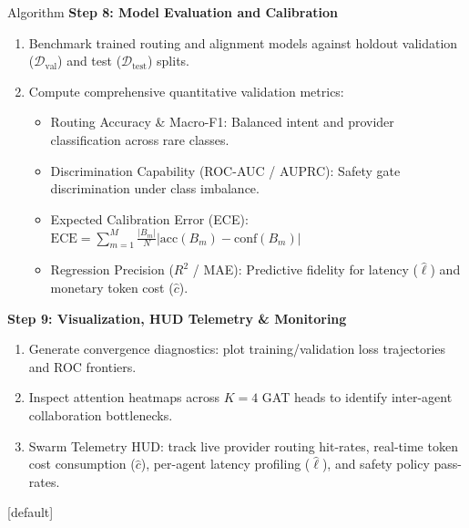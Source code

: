 \documentclass[aspectratio=169,10pt]{beamer}
\begin{document}
\begin{frame}[t]{Algorithm}
  \vspace{0.2em}
  {\large\bfseries\color{lavenderDark}Step 8: Model Evaluation and Calibration}
  \vspace{0.2em}
  \begin{enumerate}\setlength{\itemsep}{2pt}\small
    \item Benchmark trained routing and alignment models against holdout validation ($\mathcal{D}_{\text{val}}$) and test ($\mathcal{D}_{\text{test}}$) splits.
    \item Compute comprehensive quantitative validation metrics:
      \begin{itemize}\setlength{\itemsep}{1.5pt}
        \item Routing Accuracy \& Macro-F1: Balanced intent and provider classification across rare classes.
        \item Discrimination Capability (ROC-AUC / AUPRC): Safety gate discrimination under class imbalance.
        \item Expected Calibration Error (ECE): $\mathrm{ECE} = \sum_{m=1}^M \frac{|B_m|}{N} \big|\mathrm{acc}(B_m) - \mathrm{conf}(B_m)\big|$
        \item Regression Precision ($R^2$ / MAE): Predictive fidelity for latency ($\hat{\ell}$) and monetary token cost ($\hat{c}$).
      \end{itemize}
  \end{enumerate}
  \vspace{0.35em}
  {\large\bfseries\color{lavenderDark}Step 9: Visualization, HUD Telemetry \& Monitoring}
  \vspace{0.2em}
  \begin{enumerate}\setlength{\itemsep}{2pt}\small
    \item Generate convergence diagnostics: plot training/validation loss trajectories and ROC frontiers.
    \item Inspect attention heatmaps across $K=4$ GAT heads to identify inter-agent collaboration bottlenecks.
    \item Swarm Telemetry HUD: track live provider routing hit-rates, real-time token cost consumption ($\hat{c}$), per-agent latency profiling ($\hat{\ell}$), and safety policy pass-rates.
  \end{enumerate}
\end{frame}

[default]
\end{document}
